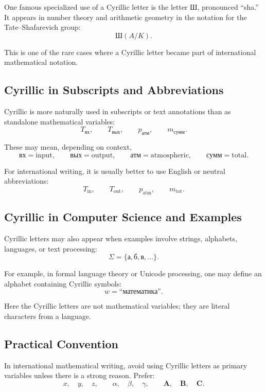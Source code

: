 \documentclass[11pt,twocolumn]{article}
\newcommand{\mat}[1]{\symbf{#1}}     %
\begin{document}
One famous specialized use of a Cyrillic letter is the letter
\(\text{Ш}\), pronounced ``sha.'' It appears in number theory and arithmetic
geometry in the notation for the Tate--Shafarevich group:
\[
\text{Ш}(A/K).
\]

This is one of the rare cases where a Cyrillic letter became part of
international mathematical notation.

\subsection{Cyrillic in Subscripts and Abbreviations}

Cyrillic is more naturally used in subscripts or text annotations than as
standalone mathematical variables:
\[
T_{\text{вх}},
\qquad
T_{\text{вых}},
\qquad
p_{\text{атм}},
\qquad
m_{\text{сумм}}.
\]

These may mean, depending on context,
\[
\text{вх} = \text{input},
\qquad
\text{вых} = \text{output},
\qquad
\text{атм} = \text{atmospheric},
\qquad
\text{сумм} = \text{total}.
\]

For international writing, it is usually better to use English or neutral
abbreviations:
\[
T_{\text{in}},
\qquad
T_{\text{out}},
\qquad
p_{\text{atm}},
\qquad
m_{\text{tot}}.
\]

\subsection{Cyrillic in Computer Science and Examples}

Cyrillic letters may also appear when examples involve strings, alphabets,
languages, or text processing:
\[
\Sigma = \{\text{а},\text{б},\text{в},\ldots\}.
\]

For example, in formal language theory or Unicode processing, one may define
an alphabet containing Cyrillic symbols:
\[
w = \text{``математика''}.
\]

Here the Cyrillic letters are not mathematical variables; they are literal
characters from a language.

\subsection{Practical Convention}

In international mathematical writing, avoid using Cyrillic letters as primary
variables unless there is a strong reason. Prefer:
\[
x,\quad y,\quad z,
\qquad
\alpha,\quad \beta,\quad \gamma,
\qquad
\mat{A},\quad \mat{B},\quad \mat{C}.
\]
\end{document}
